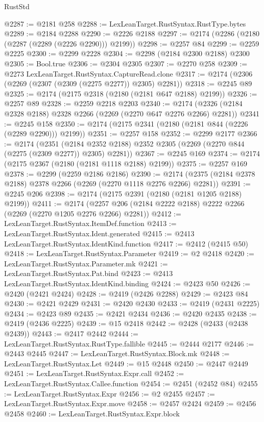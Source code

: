 \begin{lexlean}{RustStd}
\begin{coremodule}
@2287 := @2181 @258
@2288 := LexLeanTarget.RustSyntax.RustType.bytes
@2289 := @2184 @2288
@2290 := @2226 @2188
@2297 := @2174 (@2286 (@2180 (@2287 (@2289 (@2226 @2290))) @2199))
@2298 := @2257 @84
@2299 := @2259 @2225
@2300 := @2299 @2228
@2304 := @2298 (@2184 @2300 @2188) @2300
@2305 := Bool.true
@2306 := @2304 @2305
@2307 := @2270 @258
@2309 := @2273 LexLeanTarget.RustSyntax.CaptureRead.clone
@2317 := @2174 (@2306 (@2269 (@2307 (@2309 (@2275 @2277)) @2305) @2281))
@2318 := @2245 @89
@2325 := @2174 (@2175 @2318 (@2180 (@2181 @647 @2188) @2199))
@2326 := @2257 @89
@2328 := @2259 @2218 @2203
@2340 := @2174 (@2326 (@2184 @2328 @2188) @2328 @2266 (@2269 (@2270 @647 @2276 @2266) @2281))
@2341 := @2245 @158
@2350 := @2174 (@2175 @2341 (@2180 (@2181 @844 (@2226 (@2289 @2290))) @2199))
@2351 := @2257 @158
@2352 := @2299 @2177
@2366 := @2174
    (@2351 (@2184 @2352 @2188) @2352 @2305 (@2269 (@2270 @844 (@2275 (@2309 @2277)) @2305) @2281))
@2367 := @2245 @169
@2374 := @2174 (@2175 @2367 (@2180 (@2181 @1118 @2188) @2199))
@2375 := @2257 @169
@2378 := @2299 (@2259 @2186 @2186)
@2390 := @2174 (@2375 (@2184 @2378 @2188) @2378 @2266 (@2269 (@2270 @1118 @2276 @2266) @2281))
@2391 := @2245 @206
@2398 := @2174 (@2175 @2391 (@2180 (@2181 @1205 @2188) @2199))
@2411 := @2174 (@2257 @206 (@2184 @2222 @2188) @2222 @2266 (@2269 (@2270 @1205 @2276 @2266) @2281))
@2412 := LexLeanTarget.RustSyntax.ItemDef.function
@2413 := LexLeanTarget.RustSyntax.Ident.generated
@2415 := @2413 LexLeanTarget.RustSyntax.IdentKind.function
@2417 := @2412 (@2415 @50)
@2418 := LexLeanTarget.RustSyntax.Parameter
@2419 := @2 @2418
@2420 := LexLeanTarget.RustSyntax.Parameter.mk
@2421 := LexLeanTarget.RustSyntax.Pat.bind
@2423 := @2413 LexLeanTarget.RustSyntax.IdentKind.binding
@2424 := @2423 @50
@2426 := @2420 (@2421 @2424)
@2428 := @2419 (@2426 @2288)
@2429 := @2423 @84
@2430 := @2421 @2429
@2431 := @2420 @2430
@2433 := @2419 (@2431 @2225)
@2434 := @2423 @89
@2435 := @2421 @2434
@2436 := @2420 @2435
@2438 := @2419 (@2436 @2225)
@2439 := @15 @2418
@2442 := @2428 (@2433 (@2438 @2439))
@2443 := @2417 @2442
@2444 := LexLeanTarget.RustSyntax.RustType.fallible
@2445 := @2444 @2177
@2446 := @2443 @2445
@2447 := LexLeanTarget.RustSyntax.Block.mk
@2448 := LexLeanTarget.RustSyntax.Let
@2449 := @15 @2448
@2450 := @2447 @2449
@2451 := LexLeanTarget.RustSyntax.Expr.call
@2452 := LexLeanTarget.RustSyntax.Callee.function
@2454 := @2451 (@2452 @84)
@2455 := LexLeanTarget.RustSyntax.Expr
@2456 := @2 @2455
@2457 := LexLeanTarget.RustSyntax.Expr.move
@2458 := @2457 @2424
@2459 := @2456 @2458
@2460 := LexLeanTarget.RustSyntax.Expr.block

\end{coremodule}
\end{lexlean}

